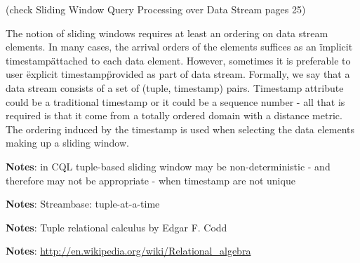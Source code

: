 


(check Sliding Window Query Processing over Data Stream pages 25)


The notion of sliding windows requires at least an ordering on data stream elements. In many cases, the arrival orders of the elements suffices as an \"implicit timestamp\" attached to each data element. However, sometimes it is preferable to user \"explicit timestamp\" provided as part of data stream. Formally, we say that a data stream consists of a set of (tuple, timestamp) pairs. Timestamp attribute could be a traditional timestamp or it could be a sequence number - all that is required is that it come from a totally ordered domain with a distance metric. The ordering induced by the timestamp is used when selecting the data elements making up a sliding window. 


\textbf{Notes}: in CQL tuple-based sliding window may be non-deterministic - and therefore may not be appropriate - when timestamp are not unique

\textbf{Notes}: Streambase: tuple-at-a-time

\textbf{Notes}: Tuple relational calculus by Edgar F. Codd

\textbf{Notes}: \href{http://en.wikipedia.org/wiki/Relational\_algebra}{http://en.wikipedia.org/wiki/Relational\_algebra}

